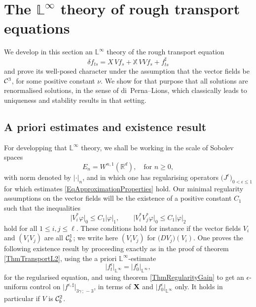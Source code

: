 \documentclass[11pt,a4paper]{amsart}
\newcommand{\RR}{\mathbb{R}}  \newcommand{\CC}{\mathbb{C}}  \newcommand{\LL}{\mathbb{L}}  \newcommand{\WW}{\mathbb{W}}
\newcommand{\bbX}{\mathbb{X}}
\newcommand{\ep}{\epsilon}
\renewcommand{\leq}{\leqslant}
\renewcommand{\geq}{\geqslant}
\numberwithin{equation}{section} %
\begin{document}
\bigskip
 

\section{The $\LL^\infty$ theory of rough transport equations}
\label{SectionLInftyTheory}

We develop in this section an $\LL^\infty$ theory of the rough transport equation 
\begin{equation}
\label{EqTransportEq}
\delta f_{ts} = X\,Vf_s +  \bbX\,V V f_s + f^\sharp_{ts}
\end{equation}  
and prove its well-posed character under the assumption that the vector fields be $\mathcal{C}^3$, for some positive constant $\nu$. We show for that purpose that all solutions are renormalised solutions, in the sense of di~Perna--Lions, which classically leads to uniqueness and stability results in that setting. 

\medskip

\subsection{A priori estimates and existence result}
\label{SubsectionAPrioriEstimatesLInfty}

For developping that $\LL^\infty$ theory, we shall be working in the scale of Sobolev spaces 
$$
E_n = W^{n,1}(\RR^d),\quad\textrm{for } n\geq 0,
$$
with norm denoted by $|\cdot|_n$, and in which one has regularising operators $\big(J^\ep\big)_{0<\epsilon\leq 1}$ for which estimates \eqref{EqApproximationProperties} hold. Our minimal regularity assumptions on the vector fields will be the existence of a positive constant $C_1$ such that the inequalities
\begin{equation}
\label{EqContinuityConditionsVStar}
\big|V_i^*\varphi\big|_0 \leq C_1 |\varphi|_1, \quad\quad \big|V_i^*V_j^*\varphi\big|_0 \leq C_1 |\varphi|_2
\end{equation}
hold for all $1\leq i,j\leq\ell$. These conditions hold for instance if the vector fields $V_i$ and $(V_iV_j)$ are all $\mathcal{C}^1_b$; we write here $(V_iV_j)$ for $\big(DV_j\big)(V_i)$. One proves the following existence result by proceeding exactly as in the proof of theorem \ref{ThmTransportL2}, using the a priori $\LL^\infty$-estimate
$$
\big| f_t^\ep \big|_{\LL^\infty} = \big|f_0^\ep\big|_{\LL^\infty},
$$
for the regularised equation, and using theorem \ref{ThmRegularityGain} to get an $\epsilon$-uniform control on $\big|f^{\epsilon,\sharp}\big|_{3\gamma\,;\,-3}$, in terms of ${\bf X}$ and $\big|f_0^\ep\big|_{\LL^\infty}$ only. It holds in particular if $V$ is $\mathcal{C}^2_b$.
\end{document}
